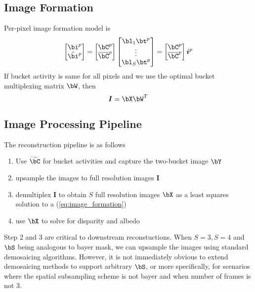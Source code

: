 \documentclass[11pt]{article}
\renewcommand{\si}{\boldsymbol{i}}
\renewcommand{\sI}{\boldsymbol{I}}
\begin{document}
\subsection{Image Formation}
Per-pixel image formation model is
\[
    \begin{bmatrix}
        \bi^p \\ \hat{\bi}^p
    \end{bmatrix}
    = 
    \begin{bmatrix}
        \bC^p \\ \overline{\bC}^p
    \end{bmatrix}
    \begin{bmatrix}
        \bl_1 \bt^p \\ \vdots \\ \bl_S \bt^p
    \end{bmatrix}
    = 
    \begin{bmatrix}
        \bC^p \\ \overline{\bC}^p
    \end{bmatrix}
    \si^p
\]
If bucket activity is same for all pixels and we use the optimal bucket multiplexing matrix $\bW$, then
\begin{equation}
    \label{eq:image_formation}
    \sI = \bX \bW^T
\end{equation}

\subsection{Image Processing Pipeline}
The reconstruction pipeline is as follows
\begin{enumerate}
    \item Use $\widetilde{\bC}$ for bucket activities and capture the two-bucket image $\bY$
    \item upsample the images to full resolution images $\sI$
    \item demultiplex $\sI$ to obtain $S$ full resolution images $\bX$ as a least squares solution to a (\ref{eq:image_formation})
    \item use $\bX$ to solve for disparity and albedo
\end{enumerate}
Step 2 and 3 are critical to downstream reconstuctions. When $S=3,S=4$ and $\bS$ being analogous to bayer mask, we can upsample the images using standard demosaicing algorithms. However, it is not immediately obvious to extend demosaicing methods to support arbitrary $\bS$, or more specifically, for scenarios where the spatial subsampling scheme is not bayer and when number of frames is not 3. 
\end{document}
